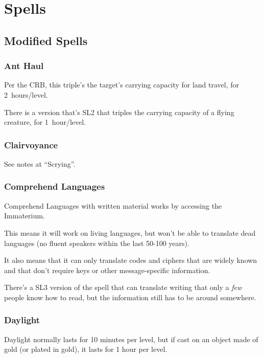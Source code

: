 
\chapter{Spells}
\label{sect-spells}

%
%
\section{Modified Spells}

%
\subsection{Ant Haul}

Per the CRB, this triple's the target's carrying capacity for land travel,
for 2~hours/level.

There is a version that's SL2 that triples the carrying capacity of a
flying creature, for 1~hour/level.
%

%
\subsection{Clairvoyance}

See notes at ``Scrying''.
%

%
\subsection{Comprehend Languages}

Comprehend Languages with written material works by accessing the
Immaterium.

This means it will work on living languages, but won't be able to translate
dead languages (no fluent speakers within the last 50-100 years).

It also means that it can only translate codes and ciphers that are widely
known and that don't require keys or other message-specific information.

There's a SL3 version of the spell that can translate writing that only a
\textit{few} people know how to read, but the information still has to be
around somewhere.
%

%
\subsection{Daylight}

Daylight normally lasts for 10 minutes per level, but if cast on an object
made of gold (or plated in gold), it lasts for 1 hour per level.

